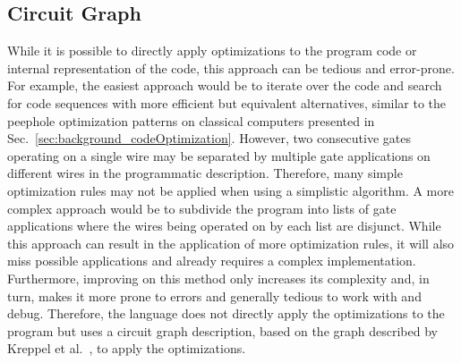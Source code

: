 \subsection{Circuit Graph}
\label{sec:concept_circuitGraph}
While it is possible to directly apply optimizations to the program code or internal representation of the code, this approach can be tedious and error-prone. For example, the easiest approach would be to iterate over the code and search for code sequences with more efficient but equivalent alternatives, similar to the peephole optimization patterns on classical computers presented in Sec.~\ref{sec:background_codeOptimization}. However, two consecutive gates operating on a single wire may be separated by multiple gate applications on different wires in the programmatic description. 
Therefore, many simple optimization rules may not be applied when using a simplistic algorithm. A more complex approach would be to subdivide the program into lists of gate applications where the wires being operated on by each list are disjunct. While this approach can result in the application of more optimization rules, it will also miss possible applications and already requires a complex implementation. Furthermore, improving on this method only increases its complexity and, in turn, makes it more prone to errors and generally tedious to work with and debug. Therefore, the language does not directly apply the optimizations to the program but uses a circuit graph description, based on the graph described by Kreppel et al.~\cite{KMO*23}, to apply the optimizations.


